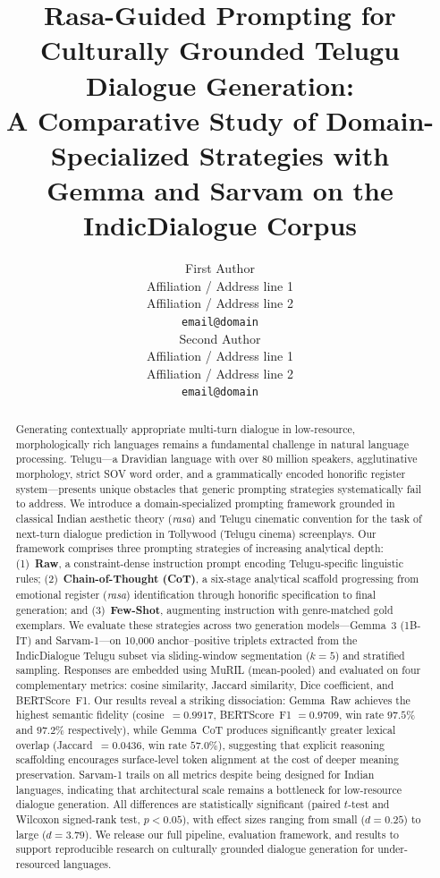 \documentclass[11pt]{article}
\title{Rasa-Guided Prompting for Culturally Grounded Telugu Dialogue Generation: \\A Comparative Study of Domain-Specialized Strategies with \\Gemma and Sarvam on the IndicDialogue Corpus}
\author{First Author \\
  Affiliation / Address line 1 \\
  Affiliation / Address line 2 \\
  \texttt{email@domain} \\\And
  Second Author \\
  Affiliation / Address line 1 \\
  Affiliation / Address line 2 \\
  \texttt{email@domain} \\}
\begin{document}
\maketitle

\begin{abstract}
Generating contextually appropriate multi-turn dialogue in low-resource, morphologically rich languages remains a fundamental challenge in natural language processing. Telugu---a Dravidian language with over 80 million speakers, agglutinative morphology, strict SOV word order, and a grammatically encoded honorific register system---presents unique obstacles that generic prompting strategies systematically fail to address. We introduce a domain-specialized prompting framework grounded in classical Indian aesthetic theory (\textit{rasa}) and Telugu cinematic convention for the task of next-turn dialogue prediction in Tollywood (Telugu cinema) screenplays. Our framework comprises three prompting strategies of increasing analytical depth: (1)~\textbf{Raw}, a constraint-dense instruction prompt encoding Telugu-specific linguistic rules; (2)~\textbf{Chain-of-Thought (CoT)}, a six-stage analytical scaffold progressing from emotional register (\textit{rasa}) identification through honorific specification to final generation; and (3)~\textbf{Few-Shot}, augmenting instruction with genre-matched gold exemplars. We evaluate these strategies across two generation models---Gemma~3 (1B-IT) and Sarvam-1---on 10,000 anchor--positive triplets extracted from the IndicDialogue Telugu subset via sliding-window segmentation ($k{=}5$) and stratified sampling. Responses are embedded using MuRIL (mean-pooled) and evaluated on four complementary metrics: cosine similarity, Jaccard similarity, Dice coefficient, and BERTScore~F1. Our results reveal a striking dissociation: Gemma~Raw achieves the highest semantic fidelity (cosine~$= 0.9917$, BERTScore~F1 $= 0.9709$, win rate $97.5\%$ and $97.2\%$ respectively), while Gemma~CoT produces significantly greater lexical overlap (Jaccard~$= 0.0436$, win rate $57.0\%$), suggesting that explicit reasoning scaffolding encourages surface-level token alignment at the cost of deeper meaning preservation. Sarvam-1 trails on all metrics despite being designed for Indian languages, indicating that architectural scale remains a bottleneck for low-resource dialogue generation. All differences are statistically significant (paired $t$-test and Wilcoxon signed-rank test, $p < 0.05$), with effect sizes ranging from small ($d = 0.25$) to large ($d = 3.79$). We release our full pipeline, evaluation framework, and results to support reproducible research on culturally grounded dialogue generation for under-resourced languages.
\end{abstract}
\end{document}

